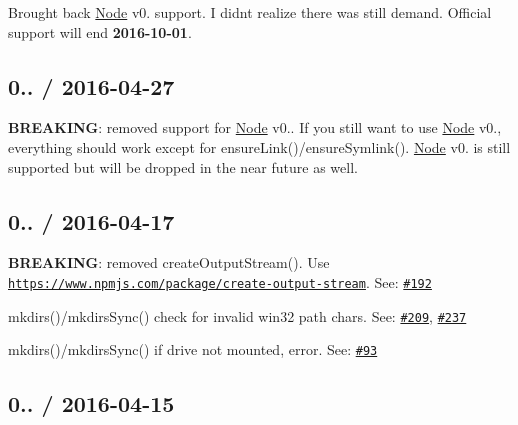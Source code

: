 
\begin{DoxyItemize}
\item Brought back \mbox{\hyperlink{classNode}{Node}} v0. support. I didn\textquotesingle{}t realize there was still demand. Official support will end {\bfseries 2016-\/10-\/01}.
\end{DoxyItemize}

\subsection*{0.. / 2016-\/04-\/27 }


\begin{DoxyItemize}
\item {\bfseries B\+R\+E\+A\+K\+I\+NG}\+: removed support for \mbox{\hyperlink{classNode}{Node}} v0.. If you still want to use \mbox{\hyperlink{classNode}{Node}} v0., everything should work except for {\ttfamily ensure\+Link()/ensure\+Symlink()}. \mbox{\hyperlink{classNode}{Node}} v0. is still supported but will be dropped in the near future as well.
\end{DoxyItemize}

\subsection*{0.. / 2016-\/04-\/17 }


\begin{DoxyItemize}
\item {\bfseries B\+R\+E\+A\+K\+I\+NG}\+: removed {\ttfamily create\+Output\+Stream()}. Use \href{https://www.npmjs.com/package/create-output-stream}{\tt https\+://www.\+npmjs.\+com/package/create-\/output-\/stream}. See\+: \href{https://github.com/jprichardson/node-fs-extra/issues/192}{\tt \#192}
\item {\ttfamily mkdirs()/mkdirs\+Sync()} check for invalid win32 path chars. See\+: \href{https://github.com/jprichardson/node-fs-extra/issues/209}{\tt \#209}, \href{https://github.com/jprichardson/node-fs-extra/issues/237}{\tt \#237}
\item {\ttfamily mkdirs()/mkdirs\+Sync()} if drive not mounted, error. See\+: \href{https://github.com/jprichardson/node-fs-extra/issues/93}{\tt \#93}
\end{DoxyItemize}

\subsection*{0.. / 2016-\/04-\/15 }


